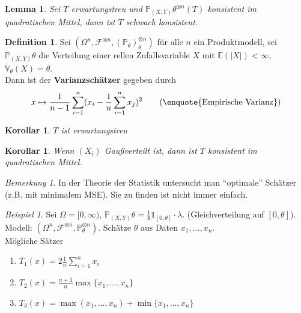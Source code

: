 \documentclass[10pt,a4paper]{article}
\newcommand{\la}{\ensuremath{\lambda}}
\newcommand{\cha}{\mathds{1}}
\newcommand{\Prb}{\mathbb P}
\newcommand{\Epv}{\ensuremath{\mathbb{E}}}
\newcommand{\Var}{\mathbb{V}}
\newcommand{\scF}{\ensuremath{\mathscr{F}}}
\theoremstyle{plain}
\newtheorem{lem}[theorem]{Lemma}
\newtheorem{kor}[theorem]{Korollar}
\theoremstyle{definition}
\newtheorem{definition}[theorem]{Definition}
\theoremstyle{remark}
\newtheorem*{bem*}{Bemerkung}
\newtheorem{exm}[theorem]{Beispiel}
\begin{document}
	\begin{lem}
		Sei $T$ erwartungstreu und $\Prb_{(X,Y)}\theta^{\otimes n}(T)$ konsistent im quadratischen Mittel, dann ist $T$ schwach konsistent.
	\end{lem}
	
	\begin{definition}
		Sei $(\Omega^n,\scF^{\otimes n},(\Prb_\theta)_\theta^{\otimes n})$ für alle $n$ ein Produktmodell, sei $\Prb_{(X,Y)}\theta$ die Verteilung einer rellen Zufallsvariable $X$ mit $\Epv(|X|)<\infty$, $\Var_\theta(X)=\theta$.\\
		Dann ist der \textbf{Varianzschätzer} gegeben durch
		\[x\mapsto\frac{1}{n-1}\sum_{i=1}^{n}(x_i-\frac{1}{n}\sum_{i=1}^{n}x_j)^2\tag{\enquote{Empirische Varianz}}\]
	\end{definition}
	\addtocounter{theorem}{-1}
	\begin{kor}
		$T$ ist erwartungstreu
	\end{kor}
	\addtocounter{theorem}{-1}
	\begin{kor}
		Wenn $(X_i)$ Gaußverteilt ist, dann ist $T$ konsistent im quadratischen Mittel.
	\end{kor}

	\begin{bem*}
		In der Theorie der Statistik untersucht man \enquote{optimale} Schätzer (z.B. mit minimalem MSE). Sie zu finden ist nicht immer einfach.
	\end{bem*}

	\begin{exm}
		Sei $\Omega=[0,\infty)$, $\Prb_{(X,Y)}\theta=\frac{1}{\theta}\cha_{[0,\theta]}\cdot\la$. (Gleichverteilung auf $[0,\theta]$).\\
		Modell: $(\Omega^n,\scF^{\otimes n},\Prb_\theta^{\otimes n})$. Schätze $\theta$ aus Daten $x_1,...,x_n$.\\
		Mögliche Sätzer
		\begin{enumerate}
			\item $T_1(x)=2\frac{1}{n}\sum_{i=1}^{n}x_i$
			\item $T_2(x)=\frac{n+1}{n}\max\{x_1,...,x_n\}$
			\item $T_3(x)=\max(x_1,...,x_n)+\min\{x_1,...,x_n\}$
		\end{enumerate}
	\end{exm}
\end{document}
